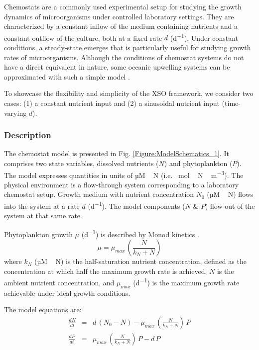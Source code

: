 \documentclass[gmd, manuscript]{copernicus}
\begin{document}
Chemostats are a commonly used experimental setup for studying the growth dynamics of microorganisms under controlled laboratory settings. They are characterized by a constant inflow of the medium containing nutrients and a constant outflow of the culture, both at a fixed rate $d$ (\unit{d^{-1}}). Under constant conditions, a steady-state emerges that is particularly useful for studying growth rates of microorganisms. Although the conditions of chemostat systems do not have a direct equivalent in nature, some oceanic upwelling systems can be approximated with such a simple model \citep{Evans1985ACycles}.

To showcase the flexibility and simplicity of the XSO framework, we consider two cases: (1) a constant nutrient input and (2) a sinusoidal nutrient input (time-varying $d$).

\subsubsection{Description}
The chemostat model is presented in Fig. \ref{Figure:ModelSchematics_1}. It comprises two state variables, dissolved nutrients ($N$) and phytoplankton ($P$). The model expresses quantities in units of \unit{µM\,N} (i.e. \unit{\mu mol\,N\,m^{-3}}). The physical environment is a flow-through system corresponding to a laboratory chemostat setup. Growth medium with nutrient concentration $N_0$ (\unit{µM\,N}) flows into the system at a rate $d$ (\unit{d^{-1}}). The model components ($N$ \& $P$) flow out of the system at that same rate.

Phytoplankton growth $\mu$ (\unit{d^{-1}}) is described by Monod kinetics \citep{Monod1942RecherchesBacteriennes}.
\begin{equation}
    \label{Eq:ChemoMU}
    \mu = \mu_{max}\,\left(\frac{N}{k_N + N}\right) 
\end{equation}
where $k_N$ (\unit{µM\,N}) is the half-saturation nutrient concentration, defined as the concentration at which half the maximum growth rate is achieved, $N$ is the ambient nutrient concentration, and $\mu_{max}$ (\unit{d^{-1}}) is the maximum growth rate achievable under ideal growth conditions.

The model equations are:
\begin{eqnarray}
\label{Eq:ChemoN}
\frac{d N}{d t} & = & d\,(N_0 - N) -\mu_{max}\,\left(\frac{N}{k_N + N}\right)\, P \\ 
\frac{d P}{d t} & = & \mu_{max}\,\left(\frac{N}{k_N + N}\right)\,P - d\,P \label{Eq:ChemoP}
\end{eqnarray}
\end{document}
